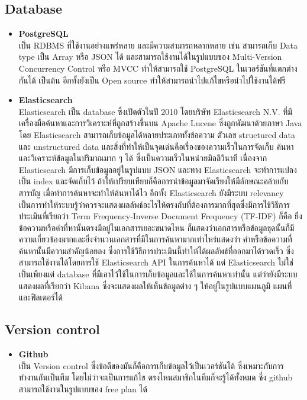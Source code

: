 \documentclass[12pt,oneside,openright,a4paper]{cpe-thai-project}
\begin{document}
\subsection{Database}
\begin{itemize}
  \item \textbf{PostgreSQL} \\
\hspace*{1cm} เป็น RDBMS ที่ใช้งานอย่างแพร่หลาย และมีความสามารถหลากหลาย เช่น สามารถเก็บ Data type เป็น Array หรือ JSON ได้ และสามารถใช้งานได้ในรูปแบบของ Multi-Version Concurrency Control หรือ MVCC ทำให้สามารถใช้ PostgreSQL ในเวอร์ชันที่แตกต่างกันได้ เป็นต้น อีกทั้งยังเป็น Open source ทำให้สามารถนำไปแก้ไขหรือนำไปใช้งานได้ฟรี \cite{WhatIsPostgresQL}
  \item \textbf{Elasticsearch} \\
\hspace*{1cm} Elasticsearch \cite{WhatIsElasticsearch, ElasticsearchForSearchEngine} เป็น database ซึ่งเปิดตัวในปี 2010 โดยบริษัท Elasticsearch N.V. ที่มีเครื่องมือค้นหาและการวิเคราะห์ที่ถูกสร้างขึ้นบน Apache Lucene ซึ่งถูกพัฒนาด้วยภาษา Java โดย Elasticsearch สามารถเก็บข้อมูลได้หลายประเภททั้งข้อความ ตัวเลข structured data และ unstructured data และสิ่งที่ทำให้เป็นจุดเด่นคือเรื่องของความเร็วในการจัดเก็บ ค้นหา และวิเคราะห์ข้อมูลในปริมาณมาก ๆ ได้ ซึ่งเป็นความเร็วในหน่วยมิลลิวินาที เนื่องจาก Elasticsearch มีการเก็บข้อมูลอยู่ในรูปแบบ JSON และทาง Elasticsearch จะทำการแปลงเป็น index และจัดเก็บไว้ ถ้าให้เปรียบเทียบก็คือการนำข้อมูลมาจัดเรียงให้มีลักษณะคล้ายกับสารบัญ เมื่อทำการค้นหาจะทำให้ค้นหาได้ไว อีกทั้ง Elasticsearch ยังมีระบบ relevancy เป็นการทำให้ระบบรู้ว่าควรจะแสดงผลลัพธ์อะไรให้ตรงกับที่ต้องการมากที่สุดซึ่งมีการใช้วิธีการประเมินที่เรียกว่า Term Frequency-Inverse Document Frequency (TF-IDF) ก็คือ ยิ่งข้อความหรือคำที่หานั้นตรงมีอยู่ในเอกสารเยอะขนาดไหน ก็แสดงว่าเอกสารหรือข้อมูลชุดนั้นก็มีความเกี่ยวข้องมากและยิ่งจำนวนเอกสารที่มีในการค้นหามากเท่าไหร่แสดงว่า คำหรือข้อความที่ค้นหานั้นมีความสำคัญน้อยลง ซึ่งการใช้วิธีการประเมินนี้ทำให้ได้ผลลัพธ์ที่ออกมาได้รวดเร็ว ซึ่งสามารถใช้งานได้โดยการใช้ Elasticsearch API ในการค้นหาได้ แต่ Elasticsearch ไม่ใช่เป็นเพียงแต่ database ที่มีเอาไว้ใช้ในการเก็บข้อมูลและใช้ในการค้นหาเท่านั้น แต่ว่ายังมีระบบแสดงผลที่เรียกว่า Kibana ซึ่งจะแสดงผลให้เห็นข้อมูลต่าง ๆ ให้อยู่ในรูปแบบแผนภูมิ แผนที่ และฟิลเตอร์ได้
\end{itemize}
\subsection{Version control}
\begin{itemize}
  \item \textbf{Github} \\
\hspace*{1cm} เป็น Version control ซึ่งข้อดีของมันก็คือการเก็บข้อมูลไว้เป็นเวอร์ชันได้ ซึ่งเหมาะกับการทำงานกันเป็นทีม โดยไม่ว่าจะเป็นการแก้ไข ตรงไหนสมาชิกในทีมก็จะรู้ได้ทั้งหมด ซึ่ง github สามารถใช้งานในรูปแบบของ free plan ได้ \cite{WhatIsGithub}
\end{itemize} 
\end{document}
